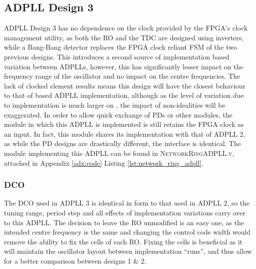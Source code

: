 \subsection{\acs{ADPLL} Design 3}
\acs{ADPLL} Design 3 has no dependence on the clock provided by the \ac{FPGA}'s clock management utility, as both the \ac{RO} and the \ac{TDC} are designed using inverters, while a Bang-Bang detector replaces the \ac{FPGA} clock reliant \ac{FSM} of the two previous designs. This introduces a second source of implementation based variation between \acp{ADPLL}, however, this has significantly lesser impact on the frequency range of the oscillator and no impact on the centre frequencies. The lack of  clocked element results means this design will have the closest behaviour to that of  based \ac{ADPLL} implementation, although as the level of variation due to implementation is much larger on , the impact of non-idealities will be exaggerated.
In order to allow quick exchange of \acp{PD} or other modules, the module in which this \ac{ADPLL} is implemented is still retains the \ac{FPGA} clock as an input. In fact, this module shares its implementation with that of \ac{ADPLL} 2, as while the \ac{PD} designs are drastically different, the interface is identical. The module implementing this \ac{ADPLL} can be found in \textsc{NetworkRingADPLL.v}, attached in Appendix \ref{adx:code} Listing \ref{lst:network_ring_adpll}.

\subsubsection{\acl{DCO}}
The \ac{DCO} used in \ac{ADPLL} 3 is identical in form to that used in \ac{ADPLL} 2, so the tuning range, period step and all effects of implementation variations carry over to this \ac{ADPLL}. The decision to leave the \ac{RO} unmodified is an easy one, as the intended centre frequency is the same and changing the control code width would remove the ability to fix the cells of each \ac{RO}. Fixing the cells is beneficial as it will maintain the oscillator layout between implementation ``runs'', and thus allow for a better comparison between designs 1 \& 2.


